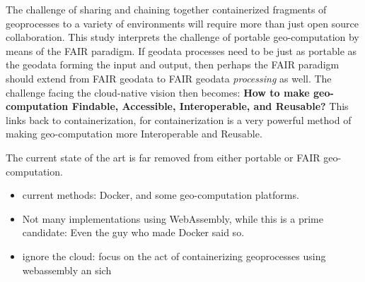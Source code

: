 

The challenge of sharing and chaining together containerized fragments of geoprocesses to a variety of environments will require more than just open source collaboration. 
This study interprets the challenge of portable geo-computation by means of the FAIR paradigm. 
If geodata processes need to be just as portable as the geodata forming the input and output, then perhaps the FAIR paradigm should extend from FAIR geodata to FAIR geodata \emph{processing} as well.
The challenge facing the cloud-native vision then becomes: \textbf{How to make geo-computation Findable, Accessible, Interoperable, and Reusable?} 
This links back to containerization, for containerization is a very powerful method of making geo-computation more Interoperable and Reusable.

The current state of the art is far removed from either portable or FAIR geo-computation. 
\begin{itemize}
  \item current methods: Docker, and some geo-computation platforms.
  \item Not many implementations using WebAssembly, while this is a prime candidate: Even the guy who made Docker said so. 
  \item ignore the cloud: focus on the act of containerizing geoprocesses using webassembly an sich
\end{itemize}

